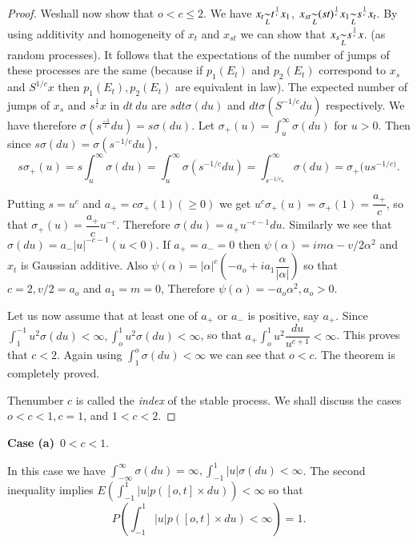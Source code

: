 \begin{proof}
We\pageoriginale shall now show that $o < c \le 2$. We have $x_t
{\displaystyle{\mathop{\sim}_{L}}}t^{\frac{1}{c}} x_1$, $x_{st} \undersim{L}
(st)^{\frac{1}{c}}\break x_1
\undersim{L} s^{\frac{1}{c}} x_t$. By using additivity and homogeneity of
$x_t$ and $x_{st}$ we can show that $x_s {\displaystyle{\mathop{\sim}_{L}}} s^{
  \frac{1}{c}}x$. (as random processes). It follows that the
expectations of the number of jumps of these processes are the same
(because if $p_1 (E_t)$ and $p_2 (E_t)$ correspond to $x_s$ and
$S^{1/c} x$ then $p_1 (E_t), p_2 (E_t)$ are equivalent in law). The
expected number of jumps of $x_s$ and $s^{\frac{1}{c}}x$ in $dt\ du$
are $sdt \sigma (du)$ and $dt \sigma (S^{-1/c}du)$ respectively. We
have therefore $\sigma(s^{\frac{-1}{c}}du) = s \sigma (du)$. Let
$\sigma_+ (u) = \int_{u}^\infty \sigma (du)$ for $u  >  0$. Then since
$s \sigma (du)= \sigma (s^{-1/c}du)$,   
$$
s \sigma_+ (u)= s \int_{u}^\infty \sigma (du) = \int_{u}^\infty \sigma
(s^{-1/c}du) = \int_{s^{-1 /c_u}}^\infty  \sigma (du) = \sigma_+
(us^{-1/c )}. 
$$

Putting $s = u^c$ and $a_+ = c \sigma_+(1) (\geq 0)$ we get $u^c \sigma_+  (u) =
\sigma_+ (1) = \dfrac{a_+}{c}$, so that $\sigma_+ (u) = \dfrac{a_+}{c}
u^{-c}$. Therefore $\sigma (du)= a_+  u^{-c-1} du$. Similarly we see
that $\sigma (du) = a_{-} | u |^{- c-1} (u < 0)$. If $a_+ = a_- =0$ then
$\psi ( \alpha ) = i m \alpha - v/2 \alpha^2$ and $x_t$ is Gaussian
additive. Also $\psi ( \alpha ) =  |  \alpha |^c (-a_o + i a_1
\dfrac{\alpha}{|  \alpha |})$ so that $c =2, v/2=a_o$ and $a_1 = m=0$,
Therefore $\psi ( \alpha ) =- a_o  \alpha^2, a_o > 0$. 

Let us now assume that at least one of $a_+$ or $a_ -$ is positive,
say $a_+$. Since $\int_{1}^{-1} u^2 \sigma (du) < \infty,  \int_{o}^1
u^2 \sigma (du) <  \infty$, so that $a_+ \int_{o}^1 u^2
\dfrac{du}{u^{c+1}} < \infty$. This proves that $c< 2$. Again  using
$\int_{1}^o \sigma (du) < \infty$ we can see that $o < c$. The theorem
is completely proved. 

The\pageoriginale number $c$ is called the \textit{index}  of the
stable process. 
We shall discuss the cases $o < c <  1, c=1$, and $1 < c < 2$.   
\end{proof}

\medskip
\noindent
{\bf Case (a)}~$0 <  c <  1$.
\smallskip

  In this case we have $\int_{- \infty}^\infty \sigma (du) = \infty,
  \int_{-1}^1 | u | \sigma (du) < \infty$. The second inequality implies
  $E ( \int_{-1}^1 | u | p ([o, t] \times du)) <\infty$ so that  
  $$
  P( \int_{-1}^1 | u | p ([ o,t] \times du) < \infty) =1.
  $$ 

